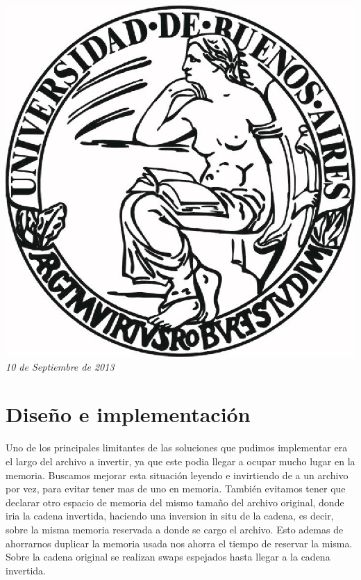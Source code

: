 \documentclass{article}
\begin{document}
\begin{titlepage}
\includegraphics[scale=0.5]{UBA.jpg}\\[1cm] %


{\large \text \em {10 de Septiembre de 2013}}\\[3cm] %
 

\vfill %

\end{titlepage}

\section{Diseño e implementación}

Uno de los principales limitantes de las soluciones que pudimos implementar era el largo del archivo a invertir, ya que este podia llegar a ocupar mucho lugar en la memoria. Buscamos mejorar esta situación leyendo e invirtiendo de a un archivo por vez, para evitar tener mas de uno en memoria. También evitamos tener que declarar otro espacio de memoria del mismo tamaño del archivo original, donde iria la cadena invertida, haciendo una inversion in situ de la cadena, es decir, sobre la misma memoria reservada a donde se cargo el archivo. Esto ademas de ahorrarnos duplicar la memoria usada nos ahorra el tiempo de reservar la misma. Sobre la cadena original se realizan swaps espejados hasta llegar a la cadena invertida.
\end{document}
